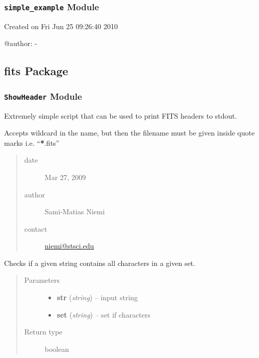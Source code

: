 \documentclass[letterpaper,10pt,english]{sphinxmanual}
\begin{document}
\subsubsection{\texttt{simple\_example} Module}
\label{SamPy.finance:simple-example-module}\label{SamPy.finance:module-SamPy.finance.simple_example}
Created on Fri Jun 25 09:26:40 2010

@author: -


\subsection{fits Package}
\label{SamPy.fits::doc}\label{SamPy.fits:fits-package}

\subsubsection{\texttt{ShowHeader} Module}
\label{SamPy.fits:module-SamPy.fits.ShowHeader}\label{SamPy.fits:showheader-module}
Extremely simple script that can be used to print FITS headers to stdout.

Accepts wildcard in the name, but then the filename must be given inside quote marks
i.e. ``{\color{red}\bfseries{}*}.fits''
\begin{quote}\begin{description}
\item[{date}] \leavevmode
Mar 27, 2009

\item[{author}] \leavevmode
Sami-Matias Niemi

\item[{contact}] \leavevmode
\href{mailto:niemi@stsci.edu}{niemi@stsci.edu}

\end{description}\end{quote}


\begin{fulllineitems}
\label{SamPy.fits:SamPy.fits.ShowHeader.containsAll}
Checks if a given string contains all characters in a given set.
\begin{quote}\begin{description}
\item[{Parameters}] \leavevmode\begin{itemize}
\item {} 
\textbf{str} (\emph{string}) -- input string

\item {} 
\textbf{set} (\emph{string}) -- set if characters

\end{itemize}

\item[{Return type}] \leavevmode
boolean

\end{description}\end{quote}

\end{fulllineitems}
\end{document}
